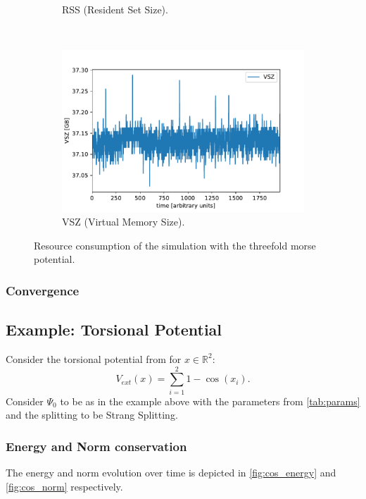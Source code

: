 \documentclass[11pt, a4paper, oneside]{article}
\begin{document}
\begin{figure}[h]
\begin{subfigure}[b]{0.5 \textwidth}
    \caption{RSS (Resident Set Size).}
  \end{subfigure}
  ~
  \begin{subfigure}[b]{0.5 \textwidth}
    \includegraphics[width = \textwidth]{graphics/threefold_morse/threefold_VSZ.pdf}
    \caption{VSZ (Virtual Memory Size).}
  \end{subfigure}
  \caption{Resource consumption of the simulation with the threefold morse potential.}
  \label{fig:threefold_resource}
\end{figure}

\subsubsection{Convergence}


\subsection{Example: Torsional Potential}
Consider the torsional potential from  for $x \in \mathbb{R}^2$:
\begin{equation*}
  V_{ext}(x) = \sum_{i=1}^2 1 - \cos(x_i).
\end{equation*}
Consider $\Psi_0$ to be as in the example above with the parameters from \cref{tab:params} and the splitting to be Strang Splitting.

\subsubsection{Energy and Norm conservation}
The energy and norm evolution over time is depicted in \cref{fig:cos_energy} and \cref{fig:cos_norm} respectively.
\end{document}
